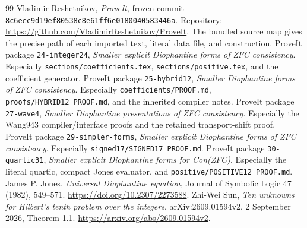 \documentclass[11pt]{article}
\theoremstyle{definition}\newtheorem{definition}[theorem]{Definition}
\theoremstyle{remark}\newtheorem{remark}[theorem]{Remark}
\newcommand{\pin}{\texttt{8c6eec9d19ef80538c8e61ff6e0180040583446a}}
\newcommand{\repo}{\url{https://github.com/VladimirReshetnikov/ProveIt}}
\begin{document}






\begin{thebibliography}{99}
 Vladimir Reshetnikov, \emph{ProveIt}, frozen commit
\pin. Repository: \repo. The bundled source map gives the precise path
of each imported text, literal data file, and construction.
 ProveIt package \texttt{24-integer24},
\emph{Smaller explicit Diophantine forms of ZFC consistency}.
Especially \texttt{sections/coefficients.tex},
\texttt{sections/positive.tex}, and the coefficient generator.
 ProveIt package \texttt{25-hybrid12},
\emph{Smaller Diophantine forms of ZFC consistency}.
Especially \texttt{coefficients/PROOF.md},
\texttt{proofs/HYBRID12\_PROOF.md}, and the inherited compiler notes.
 ProveIt package \texttt{27-wave4},
\emph{Smaller Diophantine presentations of ZFC consistency}.
Especially the Wang943 compiler/interface proofs and the retained
transport-shift proof.
 ProveIt package \texttt{29-simpler-forms},
\emph{Smaller explicit Diophantine forms of ZFC consistency}.
Especially \texttt{signed17/SIGNED17\_PROOF.md}.
 ProveIt package \texttt{30-quartic31},
\emph{Smaller explicit Diophantine forms for Con(ZFC)}.
Especially the literal quartic, compact Jones evaluator, and
\texttt{positive/POSITIVE12\_PROOF.md}.
 James P. Jones, \emph{Universal Diophantine equation},
Journal of Symbolic Logic 47 (1982), 549--571.
\url{https://doi.org/10.2307/2273588}.
 Zhi-Wei Sun, \emph{Ten unknowns for Hilbert's tenth problem
over the integers}, arXiv:2609.01594v2, 2 September 2026, Theorem 1.1.
\url{https://arxiv.org/abs/2609.01594v2}.
\end{thebibliography}
\end{document}
